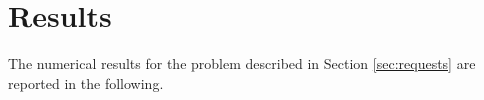 \section{Results}
\label{sec:results}

The numerical results for the problem described in Section \ref{sec:requests} are reported in the following.
